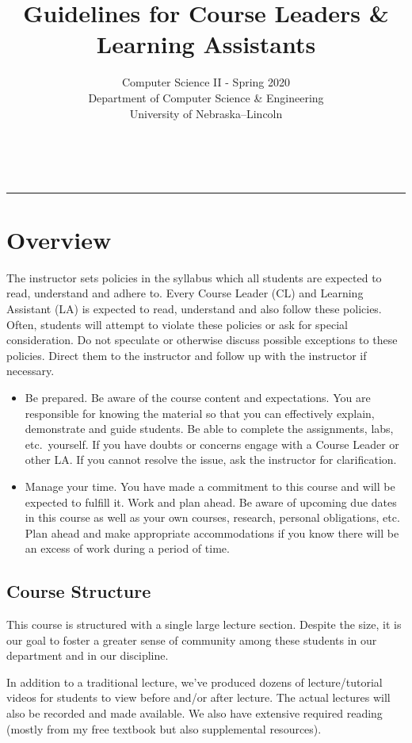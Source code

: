 \documentclass[12pt]{scrartcl}
\title{Guidelines for Course Leaders \& Learning Assistants}\let\Title\@title
\subtitle{Computer Science II - Spring 2020\\
{\small
\vskip1cm
Department of Computer Science \& Engineering \\
University of Nebraska--Lincoln}
\vskip-1cm}
\date{~}
\begin{document}
\maketitle


\hrule

\section*{Overview}

The instructor sets policies in the syllabus which all students 
are expected to read, understand and adhere to. Every Course Leader
(CL) and Learning Assistant (LA) is expected to read, understand 
and also follow these policies.  Often, students will attempt to 
violate these policies or ask for special consideration.  Do not 
speculate or otherwise discuss possible exceptions to these policies.  
Direct them to the instructor and follow up with the instructor if 
necessary.

\begin{itemize}
  \item Be prepared.  Be aware of the course content and expectations.
  You are responsible for knowing the material so that you can effectively
  explain, demonstrate and guide students.  Be able to complete the assignments, 
  labs, etc.\ yourself.  If you have doubts or concerns engage with
  a Course Leader or other LA.  If you cannot resolve the issue, ask the 
  instructor for clarification.
  \item Manage your time.  You have made a commitment to this course and
  will be expected to fulfill it.  Work and plan ahead.  Be aware of 
  upcoming due dates in this course as well as your own courses, research, 
  personal obligations, etc.  Plan ahead and make appropriate accommodations 
  if you know there will be an excess of work during a period of time.
\end{itemize}

\subsection*{Course Structure}

This course is structured with a single large lecture section. 
Despite the size, it is our goal to foster a greater sense of 
community among these students in our department and in our 
discipline.  

In addition to a traditional lecture, we've produced dozens of 
lecture/tutorial videos for students to view before and/or after lecture. 
The actual lectures will also be recorded and made available.
We also have extensive required reading (mostly from my free textbook but 
also supplemental resources).  
\end{document}
